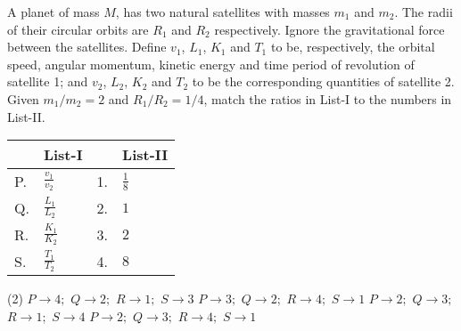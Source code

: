 \item A planet of mass \( M \), has two natural satellites with masses \( m_1 \) and \( m_2 \). The radii of their circular orbits are \( R_1 \) and \( R_2 \) respectively. Ignore the gravitational force between the satellites. Define \( v_1 \), \( L_1 \), \( K_1 \) and \( T_1 \) to be, respectively, the orbital speed, angular momentum, kinetic energy and time period of revolution of satellite 1; and \( v_2 \), \( L_2 \), \( K_2 \) and \( T_2 \) to be the corresponding quantities of satellite 2. Given \( m_1/m_2 = 2 \) and \( R_1/R_2 = 1/4 \), match the ratios in List-I to the numbers in List-II.

\begin{center}
    \renewcommand{\arraystretch}{2.5}
    \begin{table}
        \centering
        \begin{tabular}{p{0.25cm}p{6cm}|p{0.25cm}p{6cm}}
        \hline
        & List-I & &List-II \\
        \hline
        P. & \( \frac{v_1}{v_2} \) & 1. & \( \frac{1}{8} \) \\
        Q. & \( \frac{L_1}{L_2} \) & 2. & \( 1 \) \\
        R. & \( \frac{K_1}{K_2} \) & 3. & \( 2 \) \\
        S. & \( \frac{T_1}{T_2} \) & 4. & \( 8 \) \\
        \hline
        \end{tabular}
    \end{table}
\end{center}

\begin{tasks}(2)
    \task \( P \rightarrow 4; \) \( Q \rightarrow 2; \) \( R \rightarrow 1; \) \( S \rightarrow 3 \)
    \task \( P \rightarrow 3; \) \( Q \rightarrow 2; \) \( R \rightarrow 4; \) \( S \rightarrow 1 \)
    \task \( P \rightarrow 2; \) \( Q \rightarrow 3; \) \( R \rightarrow 1; \) \( S \rightarrow 4 \)
    \task \( P \rightarrow 2; \) \( Q \rightarrow 3; \) \( R \rightarrow 4; \) \( S \rightarrow 1 \)
\end{tasks}

